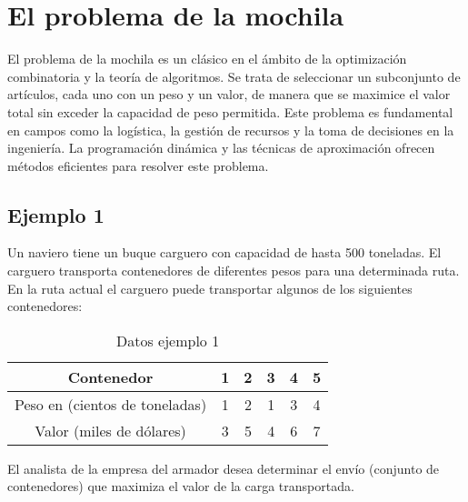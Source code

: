 \section{El problema de la mochila}
El problema de la mochila es un clásico en el ámbito de la optimización combinatoria y la teoría de algoritmos. Se trata de seleccionar un subconjunto de artículos, cada uno con un peso y un valor, de manera que se maximice el valor total sin exceder la capacidad de peso permitida. Este problema es fundamental en campos como la logística, la gestión de recursos y la toma de decisiones en la ingeniería. La programación dinámica y las técnicas de aproximación ofrecen métodos eficientes para resolver este problema.

\subsection{Ejemplo 1}
Un naviero tiene un buque carguero con capacidad de hasta 500 toneladas. El carguero transporta contenedores de diferentes pesos para una determinada ruta. En la ruta actual el carguero puede transportar algunos de los siguientes contenedores:

\begin{table}[h!]
\centering
\begin{tabular}{|c|c|c|c|c|c|}
\hline
Contenedor & 1 & 2 & 3 & 4 & 5 \\
\hline
Peso en (cientos de toneladas) & 1 & 2 & 1 & 3 & 4 \\
\hline
Valor (miles de dólares) & 3 & 5 & 4 & 6 & 7 \\
\hline
\end{tabular}
\caption{Datos ejemplo 1}
\end{table}

El analista de la empresa del armador desea determinar el envío (conjunto de contenedores) que maximiza el valor de la carga transportada.

